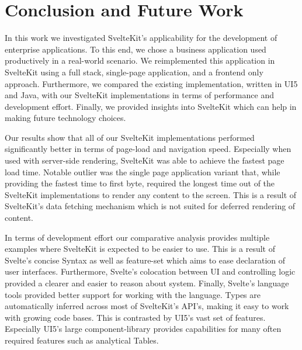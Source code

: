 \chapter{Conclusion and Future Work}
\label{ch:conclusion}




In this work we investigated SvelteKit's applicability for the development of enterprise applications. To this end, we chose a business application used productively in a real-world scenario. We reimplemented this application in SvelteKit using a full stack, single-page application, and a frontend only approach. Furthermore, we compared the existing implementation, written in UI5 and Java, with our SvelteKit implementations in terms of performance and development effort. Finally, we provided insights into SvelteKit which can help in making future technology choices.

Our results show that all of our SvelteKit implementations performed significantly better in terms of page-load and navigation speed. Especially when used with server-side rendering, SvelteKit was able to achieve the fastest page load time. Notable outlier was the single page application variant that, while providing the fastest time to first byte, required the longest time out of the SvelteKit implementations to render any content to the screen. This is a result of SvelteKit's data fetching mechanism which is not suited for deferred rendering of content.

In terms of development effort our comparative analysis provides multiple examples where SvelteKit is expected to be easier to use. This is a result of Svelte's concise Syntax as well as feature-set which aims to ease declaration of user interfaces. Furthermore, Svelte's colocation between UI and controlling logic provided a clearer and easier to reason about system. Finally, Svelte's language tools provided better support for working with the language. Types are automatically inferred across most of SvelteKit's API's, making it easy to work with growing code bases. This is contrasted by UI5's vast set of features. Especially UI5's large component-library provides capabilities for many often required features such as analytical Tables. 

